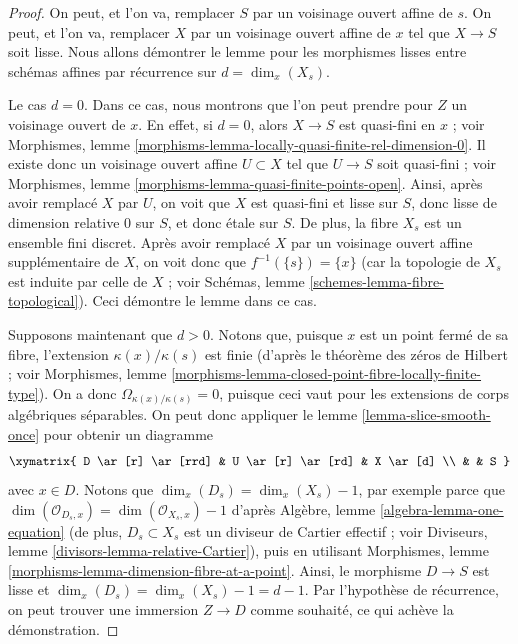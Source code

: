 \begin{proof}
On peut, et l'on va, remplacer $S$ par un voisinage ouvert affine de $s$.
On peut, et l'on va, remplacer $X$ par un voisinage ouvert affine de $x$
tel que $X \to S$ soit lisse.
Nous allons démontrer le lemme pour les morphismes lisses entre schémas affines
par récurrence sur $d = \dim_x(X_s)$.

\medskip\noindent
Le cas $d = 0$. Dans ce cas, nous montrons que l'on peut prendre pour $Z$
un voisinage ouvert de $x$. En effet, si $d = 0$, alors $X \to S$
est quasi-fini en $x$ ; voir
Morphismes, lemme \ref{morphisms-lemma-locally-quasi-finite-rel-dimension-0}.
Il existe donc un voisinage ouvert affine $U \subset X$
tel que $U \to S$ soit quasi-fini ; voir
Morphismes, lemme \ref{morphisms-lemma-quasi-finite-points-open}.
Ainsi, après avoir remplacé $X$ par $U$, on voit que
$X$ est quasi-fini et lisse sur $S$, donc
lisse de dimension relative $0$ sur $S$, et donc
\'etale sur $S$. De plus, la fibre $X_s$ est un ensemble fini
discret. Après avoir remplacé $X$ par un voisinage ouvert affine supplémentaire
de $X$, on voit donc que $f^{-1}(\{s\}) = \{x\}$ (car la topologie
de $X_s$ est induite par celle de $X$ ; voir
Schémas, lemme \ref{schemes-lemma-fibre-topological}).
Ceci démontre le lemme dans ce cas.

\medskip\noindent
Supposons maintenant que $d > 0$. Notons que, puisque $x$ est un point fermé de sa
fibre, l'extension $\kappa(x)/\kappa(s)$ est finie (d'après le
théorème des zéros de Hilbert ; voir
Morphismes, lemme \ref{morphisms-lemma-closed-point-fibre-locally-finite-type}).
On a donc $\Omega_{\kappa(x)/\kappa(s)} = 0$, puisque ceci vaut pour les
extensions de corps algébriques séparables.
On peut donc appliquer le
lemme \ref{lemma-slice-smooth-once}
pour obtenir un diagramme
$$
\xymatrix{
D \ar[r] \ar[rrd] & U \ar[r] \ar[rd] & X \ar[d] \\
& & S
}
$$
avec $x \in D$. Notons que
$\dim_x(D_s) = \dim_x(X_s) - 1$, par exemple parce que
$\dim(\mathcal{O}_{D_s, x}) = \dim(\mathcal{O}_{X_s, x}) - 1$ d'après
Algèbre, lemme \ref{algebra-lemma-one-equation}
(de plus, $D_s \subset X_s$ est un diviseur de Cartier effectif ; voir
Diviseurs, lemme \ref{divisors-lemma-relative-Cartier}),
puis en utilisant
Morphismes, lemme \ref{morphisms-lemma-dimension-fibre-at-a-point}.
Ainsi, le morphisme $D \to S$ est lisse et
$\dim_x(D_s) = \dim_x(X_s) - 1 = d - 1$. Par l'hypothèse de récurrence,
on peut trouver une immersion $Z \to D$ comme souhaité, ce qui achève la démonstration.
\end{proof}

